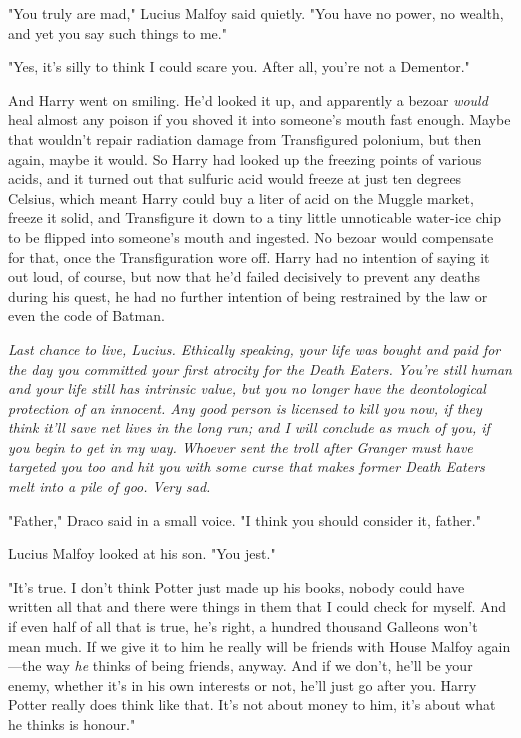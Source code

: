 "You truly are mad," Lucius Malfoy said quietly. "You have no power, no wealth,
and yet you say such things to me."

"Yes, it's silly to think I could scare you. After all, you're not a Dementor."

And Harry went on smiling. He'd looked it up, and apparently a bezoar
\emph{would} heal almost any poison if you shoved it into someone's mouth fast
enough. Maybe that wouldn't repair radiation damage from Transfigured polonium,
but then again, maybe it would. So Harry had looked up the freezing points of
various acids, and it turned out that sulfuric acid would freeze at just ten
degrees Celsius, which meant Harry could buy a liter of acid on the Muggle
market, freeze it solid, and Transfigure it down to a tiny little unnoticable
water-ice chip to be flipped into someone's mouth and ingested. No bezoar would
compensate for that, once the Transfiguration wore off. Harry had no intention
of saying it out loud, of course, but now that he'd failed decisively to
prevent any deaths during his quest, he had no further intention of being
restrained by the law or even the code of Batman.

\emph{Last chance to live, Lucius. Ethically speaking, your life was bought and
paid for the day you committed your first atrocity for the Death Eaters. You're
still human and your life still has intrinsic value, but you no longer have the
deontological protection of an innocent. Any good person is licensed to kill
you now, if they think it'll save net lives in the long run; and I will
conclude as much of you, if you begin to get in my way. Whoever sent the troll
after Granger must have targeted you too and hit you with some curse that makes
former Death Eaters melt into a pile of goo. Very sad.}

"Father," Draco said in a small voice. "I think you should consider it, father."

Lucius Malfoy looked at his son. "You jest."

"It's true. I don't think Potter just made up his books, nobody could have
written all that and there were things in them that I could check for myself.
And if even half of all that is true, he's right, a hundred thousand Galleons
won't mean much. If we give it to him he really will be friends with House
Malfoy again---the way \emph{he} thinks of being friends, anyway. And if we
don't, he'll be your enemy, whether it's in his own interests or not, he'll
just go after you. Harry Potter really does think like that. It's not about
money to him, it's about what he thinks is honour."

